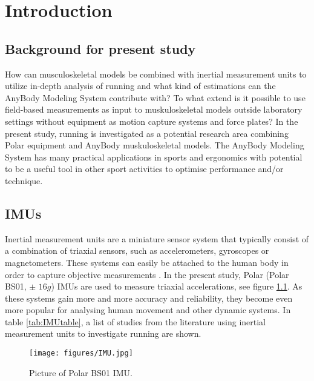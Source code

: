 \chapter{Introduction}

\section{Background for present study}

How can musculoskeletal models be combined with inertial measurement units to utilize in-depth analysis of running and what kind of estimations can the AnyBody Modeling System contribute with? To what extend is it possible to use field-based measurements as input to muskuloskeletal models outside laboratory settings without equipment as motion capture systems and force plates? In the present study, running is investigated as a potential research area combining Polar equipment and AnyBody muskuloskeletal models. The AnyBody Modeling System has many practical applications in sports and ergonomics with potential to be a useful tool in other sport activities to optimise performance and/or technique. 
    
\section{IMUs}
Inertial measurement units are a miniature sensor system that typically consist of a combination of triaxial sensors, such as accelerometers, gyroscopes or magnetometers. These systems can easily be attached to the human body in order to capture objective measurements \parencite{Shany2012}. In the present study, Polar (Polar BS01, $\pm$ $16g$) IMUs are used to measure triaxial accelerations, see figure \ref{fig:imu}. As these systems gain more and more accuracy and reliability, they become even more popular for analysing human movement and other dynamic systems. In table \ref{tab:IMUtable}, a list of studies from the literature using inertial measurement units to investigate running are shown. \\

\begin{figure}[h]
    \centering
    \texttt{[image: figures/IMU.jpg]}
    \caption{Picture of Polar BS01 IMU.}
    \label{fig:imu}
\end{figure}


